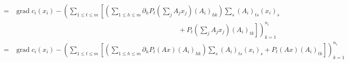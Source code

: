 \begin{align*}
= & \operatorname{grad} c_i(x_i) - \left( \sum\limits_{1\leqslant t \leqslant m} \left[ \left( \sum\limits_{1\leqslant h \leqslant m} \partial_h P_t\left( \sum\limits_j A_jx_j \right) (A_i)_{hk} \right) \sum\limits_s (A_i)_{ts} (x_i)_s \right.\right. \\
& \left.\left. \hspace{24em} + P_t \left( \sum\limits_j A_jx_j \right) (A_i)_{tk} \right] \right)_{k=1}^{n_i} \\
= & \operatorname{grad} c_i(x_i) - \left( \sum\limits_{1\leqslant t \leqslant m} \left[ \left( \sum\limits_{1\leqslant h \leqslant m} \partial_h P_t\left( Ax \right) (A_i)_{hk} \right) \sum\limits_s (A_i)_{ts} (x_i)_s + P_t \left( Ax \right) (A_i)_{tk} \right] \right)_{k=1}^{n_i}
\end{align*}
\endgroup

\printbibliography
